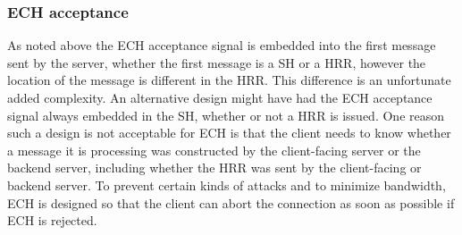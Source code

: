 
\subsubsection{ECH acceptance}

As noted above the \ac{ECH} acceptance signal is embedded into the first message sent by the server,
whether the first message is a \ac{SH} or a \ac{HRR},
however the location of the message is different in the \ac{HRR}.
This difference is an unfortunate added complexity.
An alternative design might have had the \ac{ECH} acceptance signal always embedded in the \ac{SH}, whether or not a \ac{HRR} is issued.
One reason such a design is not acceptable for \ac{ECH}
is that the client needs to know whether a message it is processing was constructed by the client-facing server or the backend server,
including whether the \ac{HRR} was sent by the client-facing or backend server.
To prevent certain kinds of attacks and to minimize bandwidth,
\ac{ECH} is designed so that
the client can abort the connection as soon as possible
if \ac{ECH} is rejected. %

